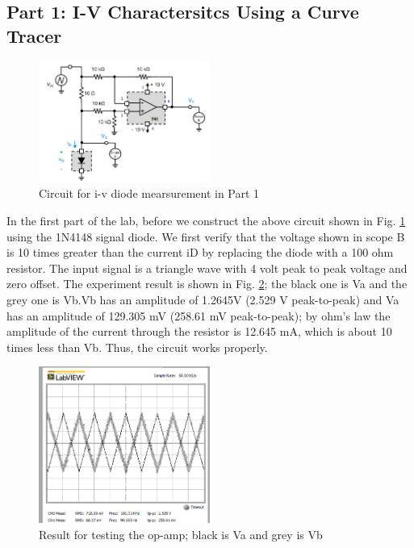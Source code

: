 \documentclass[letterpaper, 10 pt, conference]{ieeeconf}  %
\begin{document}
    \subsection{Part 1: I-V Charactersitcs Using a Curve Tracer}
	\begin{figure}[h]
        \centering
        \includegraphics[width=0.5\textwidth]{images/Part1circuit.png}
        \caption{Circuit for i-v diode mearsurement in Part 1}
		\label{fig:1}
    \end{figure}
\par In the first part of the lab, before we construct the above circuit shown in Fig. \ref{fig:1} using the 1N4148 signal diode. We first verify that the voltage shown in scope B is 10 times greater than the current iD by replacing the diode with a 100 ohm resistor. The input signal is a triangle wave with 4 volt peak to peak voltage and zero offset. The experiment result is shown in Fig. \ref{fig:2}; the black one is Va and the grey one is Vb.Vb has an amplitude of 1.2645V (2.529 V peak-to-peak) and Va has an amplitude of 129.305 mV (258.61 mV peak-to-peak); by ohm's law the amplitude of the current through the resistor is 12.645  mA, which is about 10 times less than Vb. Thus, the circuit works properly.
	\begin{figure}[h]
        \centering
        \includegraphics[width=0.5\textwidth]{images/result1.png}
        \caption{Result for testing the op-amp; black is Va and grey is Vb}
		\label{fig:2}
    \end{figure}
\end{document}
